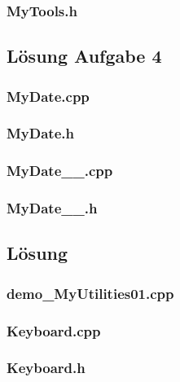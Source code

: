 \subsubsection{MyTools.h}


\subsection{Lösung Aufgabe 4}
\subsubsection{MyDate.cpp}

\subsubsection{MyDate.h}

\subsubsection{MyDate\_\_.cpp}

\subsubsection{MyDate\_\_.h}


\setcounter{section}{6}

\subsection{Lösung}
\subsubsection{demo\_MyUtilities01.cpp}

\subsubsection{Keyboard.cpp}

\subsubsection{Keyboard.h}

